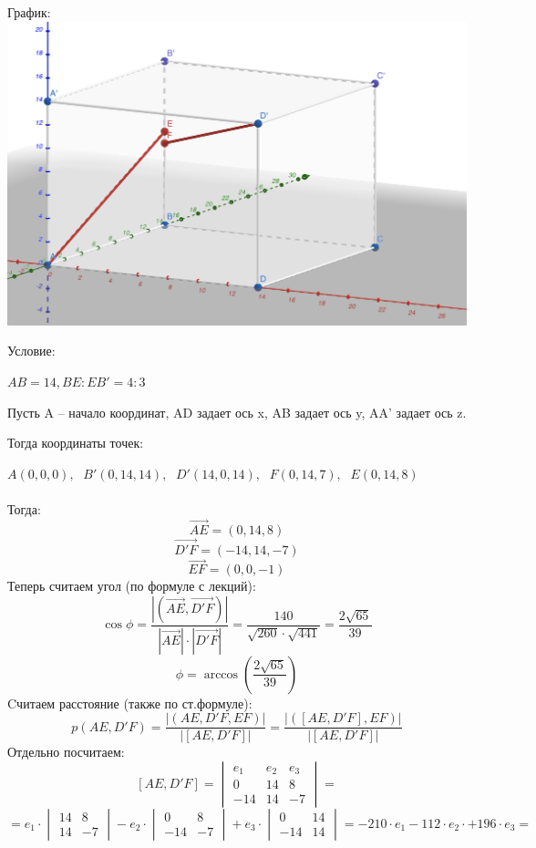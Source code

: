 \documentclass[a4paper,12pt]{article}
\begin{document}
\begin{center}
{\Large График:}
\includegraphics[scale=0.4]{4.png}
\end{center}
\begin{center}
{\Large Условие:}

$AB = 14, BE : EB' = 4:3$

Пусть  A -- начало координат, AD задает ось x, AB задает ось y, AA' задает ось z.

Тогда координаты точек:
\end{center}
$
A(0, 0, 0), \;
$
$
B'(0, 14, 14),\;
$
$
D'(14, 0, 14), \;
$
$
F(0, 14, 7), \;
$
$
E(0, 14, 8)
$
\\\\
Тогда:
\[
\overrightarrow{AE} = (0, 14, 8)
\]
\[
\overrightarrow{D'F} = (-14, 14, -7)
\]
\[
\overrightarrow{EF} = (0, 0, -1)
\]
Теперь считаем угол (по формуле с лекций):
\[
\cos \phi = \frac{|(\overrightarrow{AE}, \overrightarrow{D'F})|}{|\overrightarrow{AE}| \cdot |\overrightarrow{D'F}| } = \frac{140}{\sqrt{260} \cdot \sqrt{441}} = \frac{2 \sqrt{65}}{39}
\]
\[
\phi = \arccos \left( \frac{2 \sqrt{65}}{39} \right)
\]
Cчитаем расстояние (также по ст.формуле):
\[
p(AE, D'F) = \frac{|\left(AE, D'F, EF\right)|}{|\left[AE, D'F\right]|} = \frac{|\left(\left[AE, D'F\right], EF\right)|}{|\left[AE, D'F\right]|} 
\]
Отдельно посчитаем:
\[
\left[AE, D'F\right] = \begin{vmatrix}
e_1 & e_2 & e_3 \\
0 & 14 & 8 \\
-14 & 14 & -7 
\end{vmatrix} = 
\]
\[
=
e_1 \cdot \begin{vmatrix}
14 & 8 \\14 & -7
\end{vmatrix}  - e_2 \cdot  \begin{vmatrix}
0 & 8 \\-14 & -7
\end{vmatrix} + e_3 \cdot \begin{vmatrix}
0 & 14 \\
-14 & 14
\end{vmatrix} = -210 \cdot e_1  - 112 \cdot e_2 \cdot + 196 \cdot e_3 = 
\]
\end{document}
